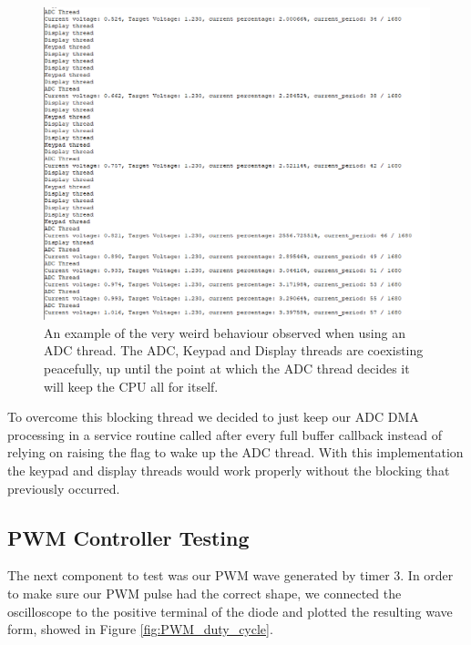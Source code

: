 \begin{figure}[h]
\centering
\includegraphics[scale=0.5]{images/weird_behaviour.png}
\caption{
\label{fig:weird_behaviour}
An example of the very weird behaviour observed when using an ADC thread. The ADC, Keypad and Display threads are coexisting peacefully, up until the point at which the ADC thread decides it will keep the CPU all for itself.
}
\end{figure}





To overcome this blocking thread we decided to just keep our ADC DMA processing in a service routine called after every full buffer callback instead of relying on raising the flag to wake up the ADC thread. With this implementation the keypad and display threads would work properly without the blocking that previously occurred.

\subsection{PWM Controller Testing}
The next component to test was our PWM wave generated by timer 3. In order to make sure our PWM pulse had the correct shape, we connected the oscilloscope to the positive terminal of the diode and plotted the resulting wave form, showed in Figure \ref{fig:PWM_duty_cycle}. 

